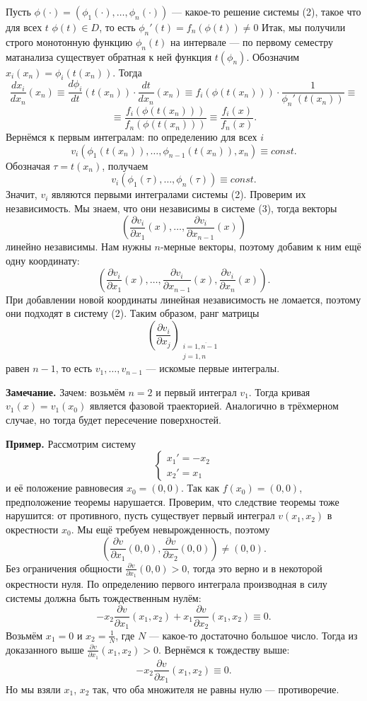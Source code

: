 Пусть $\phi(\cdot) = (\phi_1(\cdot), \dots, \phi_n(\cdot))$ --- какое-то решение системы (2), такое что для всех $t$ $\phi(t) \in D$, то есть $\phi_n'(t) = f_n(\phi(t)) \ne 0$
Итак, мы получили строго монотонную функцию $\phi_n(t)$ на интервале --- по первому семестру матанализа существует обратная к ней функция $t(\phi_n)$.
Обозначим $x_i(x_n) = \phi_i(t(x_n))$.
Тогда
\[
    \frac{dx_i}{dx_n}(x_n) \equiv \frac{d \phi_i}{dt}(t(x_n)) \cdot \frac{dt}{dx_n}(x_n) \equiv f_i(\phi(t(x_n))) \cdot \frac{1}{\phi_n'(t(x_n))} \equiv
\]
\[
    \equiv \frac{f_i(\phi(t(x_n)))}{f_n(\phi(t(x_n)))} \equiv \frac{f_i(x)}{f_n(x)}.
\]
Вернёмся к первым интегралам: по определению для всех $i$
\[
    v_i(\phi_1(t(x_n)), \dots, \phi_{n-1}(t(x_n)), x_n) \equiv const.
\]
Обозначая $\tau = t(x_n)$, получаем
\[
    v_i(\phi_1(\tau), \dots, \phi_n(\tau)) \equiv const.
\]
Значит, $v_i$ являются первыми интегралами системы (2).
Проверим их независимость.
Мы знаем, что они независимы в системе (3), тогда векторы
\[
    \left(\frac{\partial v_i}{\partial x_1}(x), \dots, \frac{\partial v_i}{\partial x_{n-1}}(x) \right)
\]
линейно независимы.
Нам нужны $n$-мерные векторы, поэтому добавим к ним ещё одну координату:
\[
    \left(\frac{\partial v_i}{\partial x_1}(x), \dots, \frac{\partial v_i}{\partial x_{n-1}}(x), \frac{\partial v_i}{\partial x_n}(x) \right).
\]
При добавлении новой координаты линейная независимость не ломается, поэтому они подходят в систему (2).
Таким образом, ранг матрицы 
\[
    \left( \frac{\partial v_i}{\partial x_j} \right)_{\substack{i = \overline {1, n - 1} \\ j = 1, n}}
\]
равен $n - 1$, то есть $v_1, \dots, v_{n-1}$ --- искомые первые интегралы.

\QED

\textbf{Замечание.} Зачем: возьмём $n = 2$ и первый интеграл $v_1$.
Тогда кривая $v_1(x) = v_1(x_0)$ является фазовой траекторией.
Аналогично в трёхмерном случае, но тогда будет пересечение поверхностей.

\textbf{Пример.} Рассмотрим систему
\[
    \begin{cases}
        x_1' = -x_2 \\
        x_2' = x_1
    \end{cases}
\]
и её положение равновесия $x_0 = (0, 0)$.
Так как $f(x_0) = (0, 0)$, предположение теоремы нарушается.
Проверим, что следствие теоремы тоже нарушится: от противного, пусть существует первый интеграл $v(x_1, x_2)$ в окрестности $x_0$.
Мы ещё требуем невырожденность, поэтому
\[
    \left( \frac{\partial v}{\partial x_1}(0, 0), \frac{\partial v}{\partial x_2}(0, 0) \right) \ne (0, 0).
\]
Без ограничения общности $\frac{\partial v}{\partial x_1}(0, 0) > 0$, тогда это верно и в некоторой окрестности нуля.
По определению первого интеграла производная в силу системы должна быть тождественным нулём:
\[
    -x_2 \frac{\partial v}{\partial x_1}(x_1, x_2) + x_1 \frac{\partial v}{\partial x_2}(x_1, x_2) \equiv 0.
\]
Возьмём $x_1 = 0$ и $x_2 = \frac{1}{N}$, где $N$ --- какое-то достаточно большое число.
Тогда из доказанного выше $\frac{\partial v}{\partial x_1}(x_1, x_2) > 0$.
Вернёмся к тождеству выше:
\[
    -x_2 \frac{\partial v}{\partial x_1}(x_1, x_2) \equiv 0.
\]
Но мы взяли $x_1$, $x_2$ так, что оба множителя не равны нулю --- противоречие.

